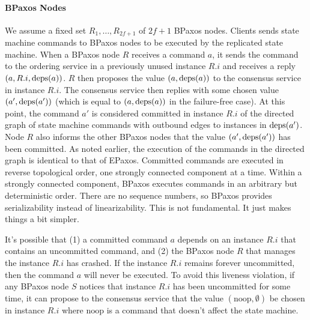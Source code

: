 \documentclass{mwhittaker}
\begin{document}
\paragraph{BPaxos Nodes}
We assume a fixed set $R_1, \ldots, R_{2f+1}$ of $2f + 1$ BPaxos nodes.
%
Clients sends state machine commands to BPaxos nodes to be executed by the
replicated state machine. When a BPaxos node $R$ receives a command $a$, it
sends the command to the ordering service in a previously unused instance $R.i$
and receives a reply $(a, R.i, \text{deps}(a))$. $R$ then proposes the value $(a,
\text{deps}(a))$ to the consensus service in instance $R.i$. The consensus service
then replies with some chosen value $(a', \text{deps}(a'))$ (which is equal to $(a,
\text{deps}(a))$ in the failure-free case). At this point, the command $a'$ is
considered committed in instance $R.i$ of the directed graph of state machine
commands with outbound edges to instances in $\text{deps}(a')$. Node $R$ also informs
the other BPaxos nodes that the value $(a', \text{deps}(a'))$ has been committed. As
noted earlier, the execution of the commands in the directed graph is identical
to that of EPaxos. Committed commands are executed in reverse topological
order, one strongly connected component at a time. Within a strongly connected
component, BPaxos executes commands in an arbitrary but deterministic order.
There are no sequence numbers, so BPaxos provides serializability instead of
linearizability. This is not fundamental. It just makes things a bit simpler.

\newcommand{\noop}{\text{noop}}
It's possible that (1) a committed command $a$ depends on an instance $R.i$
that contains an uncommitted command, and (2) the BPaxos node $R$ that manages
the instance $R.i$ has crashed. If the instance $R.i$ remains forever
uncommitted, then the command $a$ will never be executed. To avoid this
liveness violation, if any BPaxos node $S$ notices that instance $R.i$ has been
uncommitted for some time, it can propose to the consensus service that the
value $(\noop, \emptyset)$ be chosen in instance $R.i$ where $\noop$ is a
command that doesn't affect the state machine.
\end{document}
